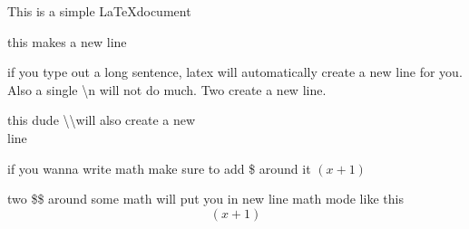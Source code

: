 \documentclass[11pt]{article}
\begin{document}
This is a simple \LaTeX document

this makes a new line

if you type out a long sentence, latex will automatically create a new line for
you. Also a single \textbackslash n will not do much. Two create a new line.

this dude \textbackslash \textbackslash will also create a new \\
line

if you wanna write math make sure to add \$ around it $(x+1)$

two \$\$ around some math will put you in new line math mode like this $$(x+1)$$
\end{document}

